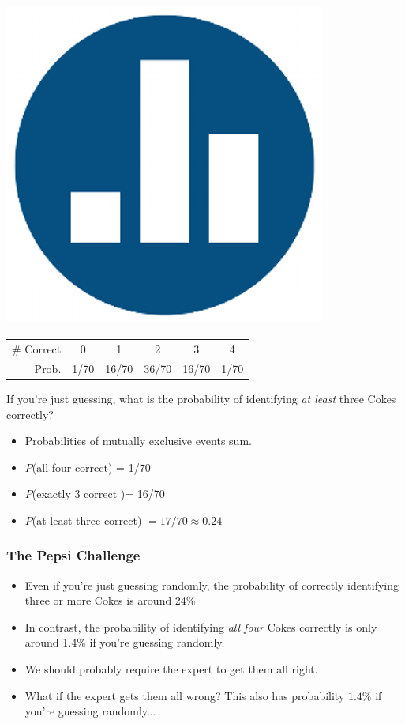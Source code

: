 \begin{frame}
	\frametitle{\includegraphics[scale = 0.05]{./images/clicker}}
	\begin{center}
		\begin{tabular}{rccccc}
		\hline
		\# Correct & 0 & 1 & 2 & 3 & 4\\
		Prob.&1/70 & 16/70 & 36/70 & 16/70 &1/70\\
		\hline
		\end{tabular}
	\end{center}
	If you're just guessing, what is the probability of identifying \alert{\emph{at least}} three Cokes correctly?
	\pause
	\begin{itemize}
\item Probabilities of mutually exclusive events sum. 
\item $P$(all four correct) = 1/70 
\item $P$(exactly 3 correct )= 16/70 
\item $P$(at least three correct) $ = 17/70 \approx 0.24$

\end{itemize}
\end{frame}

\begin{frame}
\frametitle{The Pepsi Challenge}
	\begin{itemize}
\item Even if you're just guessing randomly, the probability of correctly identifying three or more Cokes is around 24\% 
\item In contrast, the probability of identifying \emph{\alert{all four}} Cokes correctly is only around 1.4\% if you're guessing randomly. 
\item We should probably require the expert to get them all right. 
\item What if the expert gets them all wrong? This also has probability $1.4\%$ if you're guessing randomly...
\end{itemize}
\end{frame}

